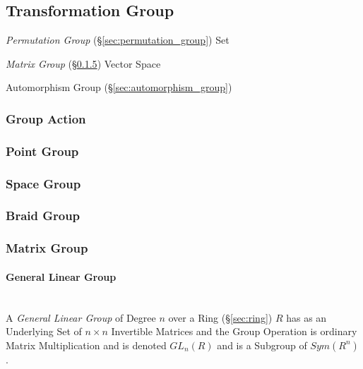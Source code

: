 \subsection{Transformation Group}\label{sec:transformation_group}

\emph{Permutation Group} (\S\ref{sec:permutation_group}) Set

\emph{Matrix Group} (\S\ref{sec:matrix_group}) Vector Space

Automorphism Group (\S\ref{sec:automorphism_group})



\subsubsection{Group Action}\label{sec:group_action}

\subsubsection{Point Group}\label{sec:point_group}

\subsubsection{Space Group}\label{sec:space_group}

\subsubsection{Braid Group}\label{sec:braid_group}

\subsubsection{Matrix Group}\label{sec:matrix_group}

\paragraph{General Linear Group}\label{sec:general_linear_group}
\hfill \\

A \emph{General Linear Group} of Degree $n$ over a Ring
(\S\ref{sec:ring}) $R$ has as an Underlying Set of $n \times n$
Invertible Matrices and the Group Operation is ordinary Matrix
Multiplication and is denoted $GL_n(R)$ and is a Subgroup of
$Sym(R^n)$.



